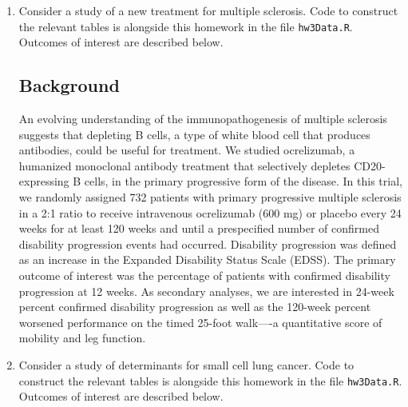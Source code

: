 \documentclass{article}
\begin{document}
	\begin{enumerate}
		\item Consider a study of a new treatment for multiple sclerosis. Code to construct the relevant tables is alongside this homework in the file \texttt{hw3Data.R}. Outcomes of interest are described below.
		


		\subsection*{Background}
		
		An evolving understanding of the immunopathogenesis of multiple sclerosis suggests that depleting B cells, a type of white blood cell that produces antibodies, could be useful for treatment. We studied ocrelizumab, a humanized monoclonal antibody treatment that selectively depletes CD20-expressing B cells, in the primary progressive form of the disease. In this trial, we randomly assigned 732 patients with primary progressive multiple sclerosis in a 2:1 ratio to receive intravenous ocrelizumab (600 mg) or placebo every 24 weeks for at least 120 weeks and until a prespecified number of confirmed disability progression events had occurred. Disability progression was defined as an increase in the Expanded Disability Status Scale (EDSS). The primary outcome of interest was the percentage of patients with confirmed disability progression at 12 weeks. As secondary analyses, we are interested in 24-week percent confirmed disability progression as well as the 120-week percent worsened performance on the timed 25-foot walk----a quantitative score of mobility and leg function.

		\item Consider a study of determinants for small cell lung cancer. Code to construct the relevant tables is alongside this homework in the file \texttt{hw3Data.R}. Outcomes of interest are described below.


\end{enumerate}
\end{document}
